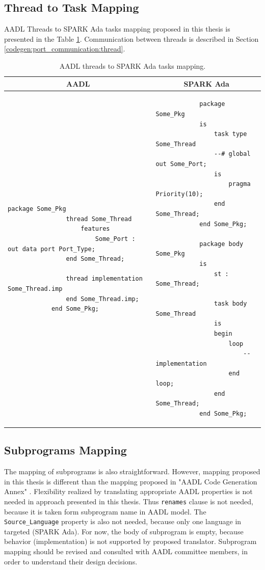 \subsection{Thread to Task Mapping}
\label{codegen:mapping:threads}

AADL Threads to SPARK Ada tasks mapping proposed in this thesis is presented in the Table \ref{table:threads2tasks}. Communication between threads is described in Section \ref{codegen:port_communication:thread}.

\singlespacing
\begin{table}[!ht]
	\caption{AADL threads to SPARK Ada tasks mapping.}
	\label{table:threads2tasks}
	\centering
  	\begin{tabular}{ | p{3.5in} | p{2.5in} |}

		\hline
		\multicolumn{1}{|c|}{\textbf{AADL}} & \multicolumn{1}{|c|}{\textbf{SPARK Ada}} \\ \hline

		\begin{lstlisting}[language=aadl]
			package Some_Pkg
				thread Some_Thread
					features
						Some_Port : out data port Port_Type;
				end Some_Thread;

				thread implementation Some_Thread.imp
				end Some_Thread.imp;
			end Some_Pkg;
		\end{lstlisting} 
		& 
		\begin{lstlisting}
			package Some_Pkg
			is
				task type Some_Thread
				--# global out Some_Port;
				is
					pragma Priority(10);
				end Some_Thread;
			end Some_Pkg;

			package body Some_Pkg
			is
				st : Some_Thread;

				task body Some_Thread
				is
				begin
					loop
						-- implementation
					end loop;
				end Some_Thread;
			end Some_Pkg;
		\end{lstlisting} 

		\\ \hline
	\end{tabular}
\end{table}
\doublespacing


\subsection{Subprograms Mapping}
\label{codegen:mapping:subprograms}

The mapping of subprograms is also straightforward. However, mapping proposed in this thesis is different than the mapping proposed in "AADL Code Generation Annex" \cite{AnnexDoc}. Flexibility realized by translating appropriate AADL properties is not needed in approach presented in this thesis. Thus \lstinline{renames} clause is not needed, because it is taken form subprogram name in AADL model. The \lstinline{Source_Language} property is also not needed, because only one language in targeted (SPARK Ada). For now, the body of subprogram is empty, because behavior (implementation) is not supported by proposed translator. Subprogram mapping should be revised and consulted with AADL committee members, in order to understand their design decisions.

